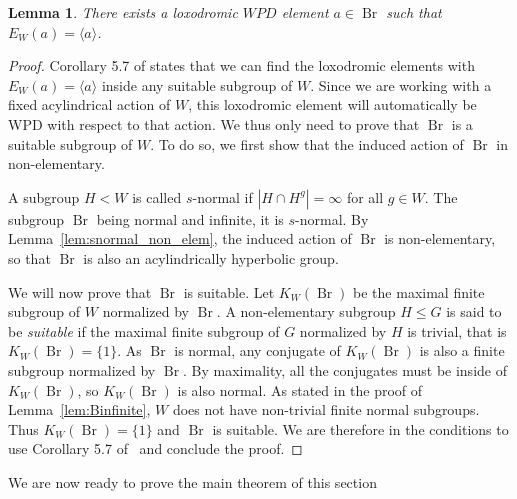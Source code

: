 \documentclass[11pt,letterpaper]{amsart}
\newtheorem{lemma}[prop]{Lemma}
\newcommand{\Br}{\operatorname{Br}}
\begin{document}
\begin{lemma}\label{lem:existanceLoxodromic}
    There exists a loxodromic $WPD$ element $a \in \Br$ such that $E_W(a) = \langle a \rangle$. 
\end{lemma}
\begin{proof}
    Corollary 5.7 of \cite{hull2017small} states that we can find the loxodromic elements with $E_W(a)=\langle a\rangle$ inside any suitable subgroup of $W$. Since we are working with a fixed acylindrical action of $W$, this loxodromic element will automatically be WPD with respect to that action. We thus only need to prove that $\Br$ is a suitable subgroup of $W$. To do so, we first show that the induced action of $\Br$ in non-elementary.

    A subgroup $H < W$ is called $s$-normal if $|H \cap H^g| = \infty$ for all $g \in W$. The subgroup $\Br$ being normal and infinite, it is $s$-normal. By Lemma~\ref{lem:snormal_non_elem}, the induced action of $\Br$ is non-elementary, so that $\Br$ is also an acylindrically hyperbolic group. 
    
    We will now prove that $\Br$ is suitable. 
    Let $K_W(\Br)$ be the maximal finite subgroup of $W$ normalized by $\Br$.
    A non-elementary subgroup $H\leq G$ is said to be \emph{suitable} if the maximal finite subgroup of $G$ normalized by $H$ is trivial, that is $K_W(\Br)=\{ 1\}$. As $\Br$ is normal, any conjugate of $K_W(\Br)$ is also a finite subgroup normalized by $\Br$. By maximality, all the conjugates must be inside of $K_W(\Br)$, so $K_W(\Br)$ is also normal. As stated in the proof of Lemma~\ref{lem:Binfinite}, $W$ does not have non-trivial finite normal subgroups. Thus $K_W(\Br)=\{ 1\}$ and $\Br$ is suitable.
    We are therefore in the conditions to use Corollary 5.7 of~\cite{hull2017small} and conclude the proof. 
    \end{proof}

We are now ready to prove the main theorem of this section
\end{document}
